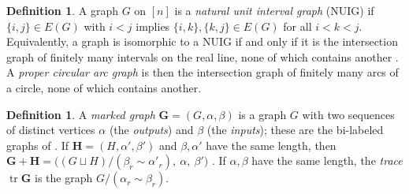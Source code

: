 \documentclass[12pt]{article}
\theoremstyle{plain}
\theoremstyle{definition}
\newtheorem{definition}[theorem]{Definition}
\theoremstyle{remark}
\newcommand{\bG}{\mathbf{G}}
\newcommand{\bH}{\mathbf{H}}
\begin{document}
\begin{definition}
A graph $G$ on $[n]$ is a \emph{natural unit interval graph} (NUIG) if $\{i, j\}\in E(G)$ with $i<j$ implies $\{i,k\}, \{k,j\}\in E(G)$ for all $i<k<j$. Equivalently, a graph is isomorphic to a NUIG if and only if it is the intersection graph of finitely many intervals on the real line, none of which contains another \cite{roberts}. A \emph{proper circular arc graph} is then the intersection graph of finitely many arcs of a circle, none of which contains another.

\end{definition}

\begin{definition}
A \emph{marked graph} $\bG=(G,\alpha,\beta)$ is a graph $G$ with two sequences of distinct vertices $\alpha$ (the \emph{outputs}) and $\beta$ (the \emph{inputs}); these are the bi-labeled graphs of \cite[Definition 3.1]{quantumiso}. If $\bH=(H,\alpha',\beta')$ and $\beta,\alpha'$ have the same length, then $\bG+\bH=\big((G\sqcup H)/(\beta_r\sim\alpha'_r),\ \alpha,\ \beta'\big)$ \cite[Definition 3.13]{quantumiso}. If $\alpha,\beta$ have the same length, the \emph{trace} $\operatorname{tr}\bG$ is the graph $G/(\alpha_r\sim\beta_r)$.
\end{definition}
\end{document}
